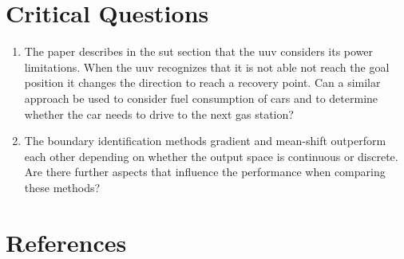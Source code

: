 \documentclass[oneside, notitlepage, twocolumn]{scrartcl}
\begin{document}
\section{Critical Questions}
\begin{enumerate}
    \item The paper describes in the \gls{sut} section that the \gls{uuv} considers its power limitations.
        When the \gls{uuv} recognizes that it is not able not reach the goal position it changes the direction to reach a recovery point.
        Can a similar approach be used to consider fuel consumption of cars and to determine whether the car needs to drive to the next gas station?
    \item The boundary identification methods gradient and mean-shift outperform each other depending on whether the output space is continuous or discrete.
        Are there further aspects that influence the performance when comparing these methods?
\end{enumerate}

\section{References}
\begingroup
\renewcommand{\section}[2]{}%
\nocite{*}
\printbibliography%
\endgroup
\end{document}
